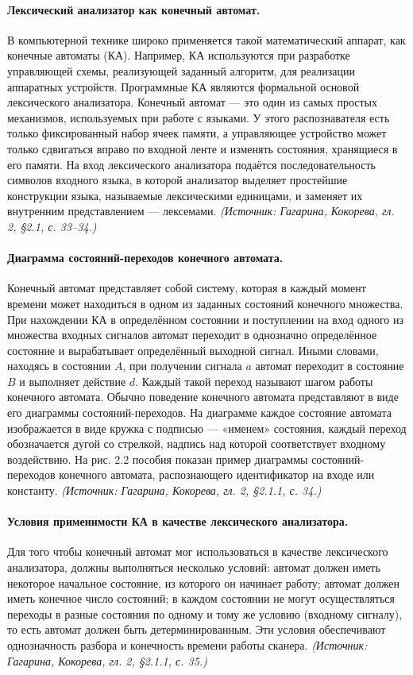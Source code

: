 \documentclass[a4paper,12pt]{article}
\begin{document}
\paragraph{Лексический анализатор как конечный автомат.}
В компьютерной технике широко применяется такой математический аппарат, как конечные автоматы (КА). Например, КА используются при разработке управляющей схемы, реализующей заданный алгоритм, для реализации аппаратных устройств. Программные КА являются формальной основой лексического анализатора. Конечный автомат — это один из самых простых механизмов, используемых при работе с языками. У этого распознавателя есть только фиксированный набор ячеек памяти, а управляющее устройство может только сдвигаться вправо по входной ленте и изменять состояния, хранящиеся в его памяти. На вход лексического анализатора подаётся последовательность символов входного языка, в которой анализатор выделяет простейшие конструкции языка, называемые лексическими единицами, и заменяет их внутренним представлением — лексемами.
\textit{(Источник: Гагарина, Кокорева, гл. 2, §2.1, с. 33--34.)}

\paragraph{Диаграмма состояний-переходов конечного автомата.}
Конечный автомат представляет собой систему, которая в каждый момент времени может находиться в одном из заданных состояний конечного множества. При нахождении КА в определённом состоянии и поступлении на вход одного из множества входных сигналов автомат переходит в однозначно определённое состояние и вырабатывает определённый выходной сигнал. Иными словами, находясь в состоянии \(A\), при получении сигнала \(a\) автомат переходит в состояние \(B\) и выполняет действие \(d\). Каждый такой переход называют шагом работы конечного автомата. Обычно поведение конечного автомата представляют в виде его диаграммы состояний-переходов. На диаграмме каждое состояние автомата изображается в виде кружка с подписью — «именем» состояния, каждый переход обозначается дугой со стрелкой, надпись над которой соответствует входному воздействию. На рис. 2.2 пособия показан пример диаграммы состояний-переходов конечного автомата, распознающего идентификатор на входе или константу.
\textit{(Источник: Гагарина, Кокорева, гл. 2, §2.1.1, с. 34.)}

\paragraph{Условия применимости КА в качестве лексического анализатора.}
Для того чтобы конечный автомат мог использоваться в качестве лексического анализатора, должны выполняться несколько условий: автомат должен иметь некоторое начальное состояние, из которого он начинает работу; автомат должен иметь конечное число состояний; в каждом состоянии не могут осуществляться переходы в разные состояния по одному и тому же условию (входному сигналу), то есть автомат должен быть детерминированным. Эти условия обеспечивают однозначность разбора и конечность времени работы сканера.
\textit{(Источник: Гагарина, Кокорева, гл. 2, §2.1.1, с. 35.)}
\end{document}
